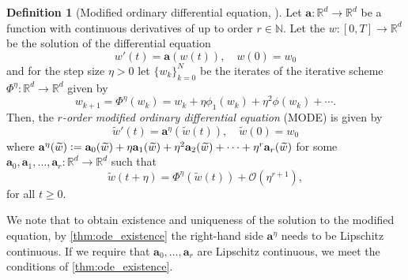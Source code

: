\documentclass[12pt]{article}
\theoremstyle{definition}
\newtheorem{definition}[definition]{Definition}
\numberwithin{equation}{section}
\newcommand{\N}{\mathbb{N}}
\newcommand{\R}{\mathbb{R}}
\newcommand{\CO}{\mathcal{O}}
\newcommand{\defeq}{\vcentcolon=}
\begin{document}
\begin{definition}[Modified ordinary differential equation, ]
  Let $\mathbf{a}: \R^d \rightarrow \R^d$ be a function with continuous derivatives of up to order $r \in \N$. Let the $w:[0,T] \rightarrow \R^d$ be the solution of the differential equation
  \begin{equation*}
    w'(t) = \mathbf{a}(w(t)), \quad w(0) = w_0
  \end{equation*}
  and for the step size $\eta > 0$ let $\{w_k\}_{k=0}^N$ be the iterates of the iterative scheme $\Phi^\eta : \R^d \rightarrow \R^d$ given by
  \begin{equation*}
    w_{k+1} = \Phi^\eta(w_k) = w_k + \eta \phi_1(w_k) + \eta^2 \phi(w_k) + \cdots.
  \end{equation*}
  Then, the \emph{$r$-order modified ordinary differential equation} (MODE) is given by
  \begin{equation}
    \label{eq:modified_ode}
    \widetilde{w}'(t) = \mathbf{a}^\eta(\widetilde{w}(t)), \quad \widetilde{w}(0) = w_0
  \end{equation}
  where $\mathbf{a}^\eta(\widetilde{w}) \defeq \mathbf{a}_0(\widetilde{w}) + \eta\mathbf{a}_1(\widetilde{w}) + \eta^2\mathbf{a}_2(\widetilde{w})+\cdots + \eta^r\mathbf{a}_r(\widetilde{w})$
  for some $\mathbf{a}_0, \mathbf{a}_1, \dots, \mathbf{a}_r : \R^d \rightarrow \R^d$ such that 
  \begin{equation*}
    \widetilde{w}(t+\eta) = \Phi^\eta(\widetilde{w}(t)) + \CO(\eta^{r+1}),
  \end{equation*}
  for all $t \geq 0$.
\end{definition}
We note that to obtain existence and uniqueness of the solution to the modified equation, by \autoref{thm:ode_existence} the right-hand side $\mathbf{a}^\eta$ needs to be Lipschitz continuous. If we require that $\mathbf{a}_0, \dots, \mathbf{a}_r$ are Lipschitz continuous, we meet the conditions of \autoref{thm:ode_existence}.
\end{document}
